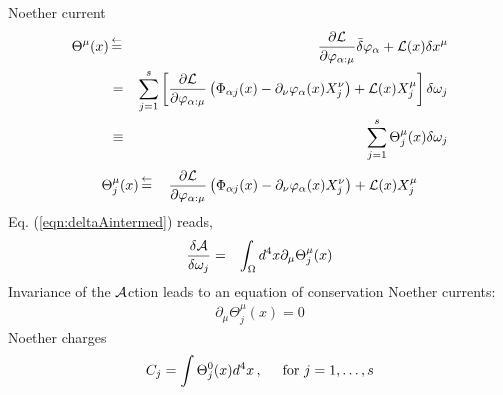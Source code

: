 Noether current
\begin{eqnarray*}
\Theta^\mu(x)
&\,\mbox{$\stackrel{\leftarrow}{=}$}\,&
\frac{\partial {\cal L}}{\partial \varphi_{\alpha : \mu}}  \bar{\delta} \varphi_{\alpha}
+
{\cal L}(x) \delta x^\mu
\nonumber\\
&=&
\sum_{j = 1}^s 
\left[
\frac{\partial {\cal L}}{\partial \varphi_{\alpha : \mu}}
\left(
\Phi_{\alpha j} (x) - \partial_\nu \varphi_\alpha(x) X_j^\nu 
\right)
+
{\cal L}(x) 
X_j^\mu 
\right]
\delta \omega_j
\nonumber\\
&\equiv&
\sum_{j = 1}^s 
\Theta_j^\mu (x)
\delta \omega_j
\end{eqnarray*}
\begin{eqnarray}
\Theta_j^\mu (x)
&\,\mbox{$\stackrel{\leftarrow}{=}$}\,&
\frac{\partial {\cal L}}{\partial \varphi_{\alpha : \mu}}
\left(
\Phi_{\alpha j} (x) - \partial_\nu \varphi_\alpha(x) X_j^\nu 
\right)
+
{\cal L}(x) 
X_j^\mu 
\label{eqn:NoetherCurrentform}
\end{eqnarray}
Eq. (\ref{eqn:deltaAintermed}) reads,
\begin{eqnarray*}
\frac{\delta {\cal A}}{\delta \omega_j}
&=&
\int_\Omega d^4 x
\partial_\mu
\Theta^\mu_j (x)
\end{eqnarray*}
Invariance of the ${\cal A}$ction leads
to an equation of  conservation Noether currents:
\begin{eqnarray}
\partial_\mu
\Theta^\mu_j (x)
=0
\label{eqn:NoetherCurrentConsv}
\end{eqnarray}
Noether charges
\begin{eqnarray}
C_j =
\int
\Theta_j^0 (x)
d^4 x\,,
\hspace{5mm}
\mbox{for }
j = 1, \dots, s
\label{eqn:NoetherCharge}
\end{eqnarray}

